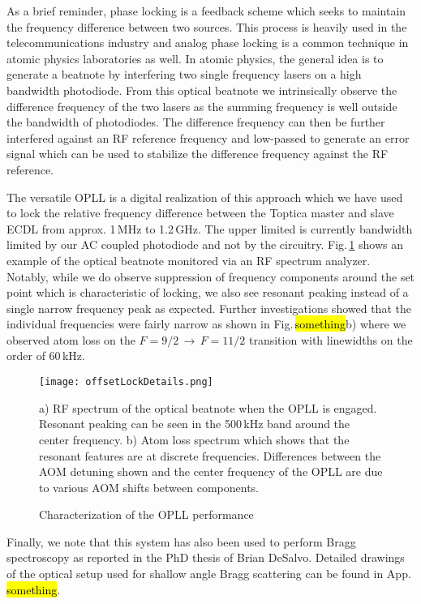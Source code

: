 As a brief reminder, phase locking is a feedback scheme which seeks to maintain the frequency difference between two sources.
This process is heavily used in the telecommunications industry and analog phase locking is a common technique in atomic physics laboratories as well.
In atomic physics, the general idea is to generate a beatnote by interfering two single frequency lasers on a high bandwidth photodiode.
From this optical beatnote we intrinsically observe the difference frequency of the two lasers as the summing frequency is well outside the bandwidth of photodiodes.
The difference frequency can then be further interfered against an RF reference frequency and low-passed to generate an error signal which can be used to stabilize the difference frequency against the RF reference.

The versatile OPLL is a digital realization of this approach which we have used to lock the relative frequency difference between the Toptica master and slave ECDL from approx. 1\,MHz to 1.2\,GHz.
The upper limited is currently bandwidth limited by our AC coupled photodiode and not by the circuitry.
Fig.\,\ref{fig:offsetDetails} shows an example of the optical beatnote monitored via an RF spectrum analyzer.
Notably, while we do observe suppression of frequency components around the set point which is characteristic of locking, we also see resonant peaking instead of a single narrow frequency peak as expected.
Further investigations showed that the individual frequencies were fairly narrow as shown in Fig.\,\hl{something}b) where we observed atom loss on the $F=9/2\,\rightarrow\,F=11/2$ transition with linewidths on the order of 60\,kHz.
	\begin{figure}
	\centerline{
		\texttt{[image: offsetLockDetails.png]}}
		\caption{Characterization of the OPLL performance}{a) RF spectrum of the optical beatnote when the OPLL is engaged. Resonant peaking can be seen in the 500\,kHz band around the center frequency. b) Atom loss spectrum which shows that the resonant features are at discrete frequencies. Differences between the AOM detuning shown and the center frequency of the OPLL are due to various AOM shifts between components.}
		 \label{fig:offsetDetails}
	\end{figure}

Finally, we note that this system has also been used to perform Bragg spectroscopy as reported in the PhD thesis of Brian DeSalvo.
Detailed drawings of the optical setup used for shallow angle Bragg scattering can be found in App. \hl{something}.


